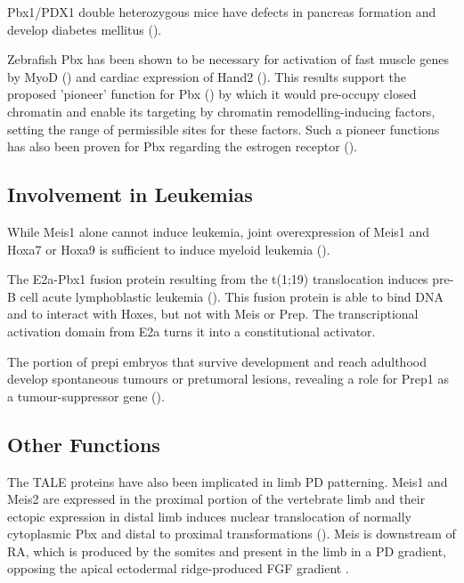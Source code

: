Pbx1/PDX1 double heterozygous mice have defects in pancreas formation and develop diabetes mellitus (\cite{Kim2002}). 

Zebrafish Pbx has been shown to be necessary for activation of fast muscle genes by MyoD (\cite{Maves2007}) and cardiac expression of Hand2 (\cite{Maves2009}). This results support the proposed 'pioneer' function for Pbx (\cite{Berkes2004}) by which it would pre-occupy closed chromatin and enable its targeting by chromatin remodelling-inducing factors, setting the range of permissible sites for these factors. Such a pioneer functions has also been proven for Pbx regarding the estrogen receptor (\cite{Magnani2011}). %

\subsection{Involvement in Leukemias}

While Meis1 alone cannot induce leukemia, joint overexpression of Meis1 and Hoxa7 or Hoxa9 is sufficient to induce myeloid leukemia (\cite{Nakamura1996, Schnabel2000}).

The E2a-Pbx1 fusion protein resulting from the t(1;19) translocation induces pre-B cell acute lymphoblastic leukemia (\cite{Kamps1990}). This fusion protein is able to bind DNA and to interact with Hoxes, but not with Meis or Prep. The transcriptional activation domain from E2a turns it into a constitutional activator. 

The portion of \ac{prepi} embryos that survive development and reach adulthood develop spontaneous tumours or pretumoral lesions, revealing a role for Prep1 as a tumour-suppressor gene (\cite{Longobardi2010}).

\subsection{Other Functions}

The \ac{TALE} proteins have also been implicated in limb \ac{PD} patterning. Meis1 and Meis2 are expressed in the proximal portion of the vertebrate limb and their ectopic expression in distal limb induces nuclear translocation of normally cytoplasmic Pbx and distal to proximal transformations (\cite{Mercader1999b}). Meis is downstream of \ac{RA}, which is produced by the somites and present in the limb in a \ac{PD} gradient, opposing the apical ectodermal ridge-produced FGF gradient \parencite{Mercader2000, Rosello-Diez2011}.


